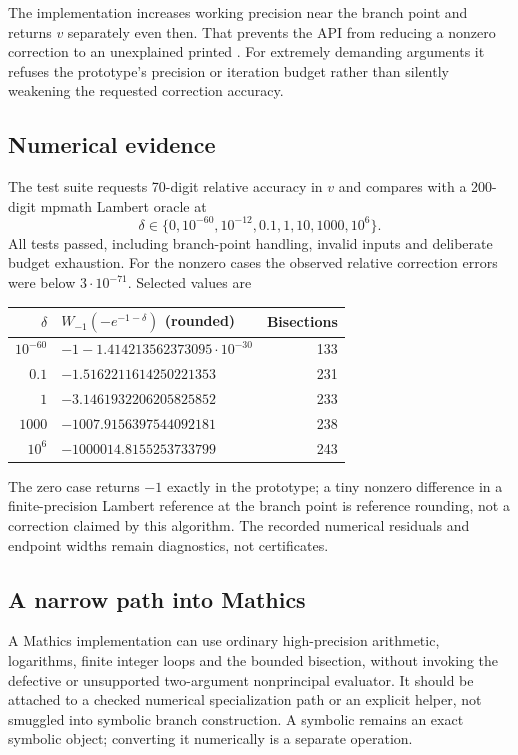 \documentclass[11pt,letterpaper]{article}
\newcommand{\code}[1]{\texttt{\detokenize{#1}}}
\begin{document}
The implementation increases working precision near the branch point and returns $v$ separately even then. That prevents the API from reducing a nonzero correction to an unexplained printed \code{-1}. For extremely demanding arguments it refuses the prototype's precision or iteration budget rather than silently weakening the requested correction accuracy.

\subsection{Numerical evidence}
The test suite requests 70-digit relative accuracy in $v$ and compares with a 200-digit mpmath Lambert oracle at
\[
 \delta\in\{0,10^{-60},10^{-12},0.1,1,10,1000,10^6\}.
\]
All tests passed, including branch-point handling, invalid inputs and deliberate budget exhaustion. For the nonzero cases the observed relative correction errors were below $3\cdot10^{-71}$. Selected values are
\begin{center}\small
\begin{tabular}{@{}rlr@{}}\toprule
$\delta$ & $W_{-1}(-e^{-1-\delta})$ (rounded) & Bisections\\\midrule
$10^{-60}$ & $-1-1.414213562373095\cdot10^{-30}$ &133\\
$0.1$ & $-1.5162211614250221353$ &231\\
$1$ & $-3.1461932206205825852$ &233\\
$1000$ & $-1007.9156397544092181$ &238\\
$10^6$ & $-1000014.8155253733799$ &243\\\bottomrule
\end{tabular}
\end{center}
The zero case returns $-1$ exactly in the prototype; a tiny nonzero difference in a finite-precision Lambert reference at the branch point is reference rounding, not a correction claimed by this algorithm. The recorded numerical residuals and endpoint widths remain diagnostics, not certificates.

\subsection{A narrow path into Mathics}
A Mathics implementation can use ordinary high-precision arithmetic, logarithms, finite integer loops and the bounded bisection, without invoking the defective or unsupported two-argument nonprincipal evaluator. It should be attached to a checked numerical specialization path or an explicit helper, not smuggled into symbolic branch construction. A symbolic \code{ProductLog[-1,z]} remains an exact symbolic object; converting it numerically is a separate operation.
\end{document}
